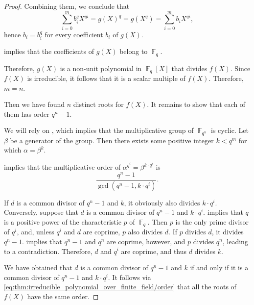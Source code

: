 \begin{proof}
  Combining them, we conclude that
  \begin{equation*}
    \sum_{i=0}^m b_i^q X^{qi} = g(X)^q = g(X^q) = \sum_{i=0}^m b_i X^{qi},
  \end{equation*}
  hence \( b_i = b_i^q \) for every coefficient \( b_i \) of \( g(X) \).

   implies that the coefficients of \( g(X) \) belong to \( \BbbF_q \).

  Therefore, \( g(X) \) is a non-unit polynomial in \( \BbbF_q[X] \) that divides \( f(X) \). Since \( f(X) \) is irreducible, it follows that it is a scalar multiple of \( f(X) \). Therefore, \( m = n \).

  Then we have found \( n \) distinct roots for \( f(X) \). It remains to show that each of them has order \( q^n - 1 \).

  We will rely on , which implies that the multiplicative group of \( \BbbF_{q^n} \) is cyclic. Let \( \beta \) be a generator of the group. Then there exists some positive integer \( k < q^m \) for which \( \alpha = \beta^k \).

   implies that the multiplicative order of \( \alpha^{q^i} = \beta^{k \cdot q^i} \) is
  \begin{equation}\label{eq:thm:irreducible_polynomial_over_finite_field/order}
    \frac {q^n - 1} {\gcd(q^n - 1, k \cdot q^i)}.
  \end{equation}

  If \( d \) is a common divisor of \( q^n - 1 \) and \( k \), it obviously also divides \( k \cdot q^i \). Conversely, suppose that \( d \) is a common divisor of \( q^n - 1 \) and \( k \cdot q^i \).  implies that \( q \) is a positive power of the characteristic \( p \) of \( \BbbF_q \). Then \( p \) is the only prime divisor of \( q^i \), and, unless \( q^i \) and \( d \) are coprime, \( p \) also divides \( d \). If \( p \) divides \( d \), it divides \( q^n - 1 \).  implies that \( q^n - 1 \) and \( q^n \) are coprime, however, and \( p \) divides \( q^n \), leading to a contradiction. Therefore, \( d \) and \( q^i \) are coprime, and thus \( d \) divides \( k \).

  We have obtained that \( d \) is a common divisor of \( q^n - 1 \) and \( k \) if and only if it is a common divisor of \( q^n - 1 \) and \( k \cdot q^i \). It follows via \eqref{eq:thm:irreducible_polynomial_over_finite_field/order} that all the roots of \( f(X) \) have the same order.
\end{proof}

